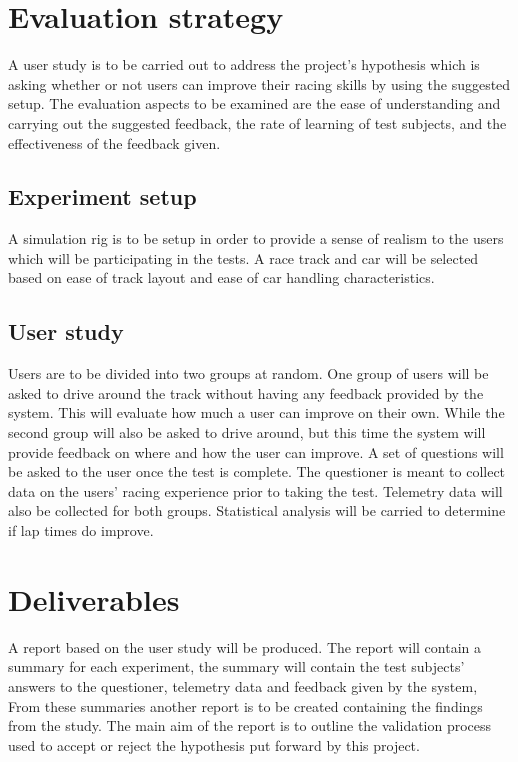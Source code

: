 \documentclass{article}
\begin{document}
\section{Evaluation strategy}

A user study is to be carried out to address the project's hypothesis which is asking whether or not users can improve their racing skills by using the suggested setup. The evaluation aspects to be examined are the ease of understanding and carrying out the suggested feedback, the rate of learning of test subjects, and the effectiveness of the feedback given.

\subsection{Experiment setup}
A simulation rig is to be setup in order to provide a sense of realism to the users which will be participating in the tests. A race track and car will be selected based on ease of track layout and ease of car handling characteristics. 

\subsection{User study}
Users are to be divided into two groups at random. One group of users will be asked to drive around the track without having any feedback provided by the system. This will evaluate how much a user can improve on their own. While the second group will also be asked to drive around, but this time the system will provide feedback on where and how the user can improve. A set of questions will be asked to the user once the test is complete. The questioner is meant to collect data on the users' racing experience prior to taking the test. Telemetry data will also be collected for both groups. Statistical analysis will be carried to determine if lap times do improve. 

\section{Deliverables}
A report based on the user study will be produced. The report will contain a summary for each experiment, the summary will contain the test subjects' answers to the questioner, telemetry data and feedback given by the system, From these summaries another report is to be created containing the findings from the study. The main aim of the report is to outline the validation process used to accept or reject the hypothesis put forward by this project.
\end{document}
